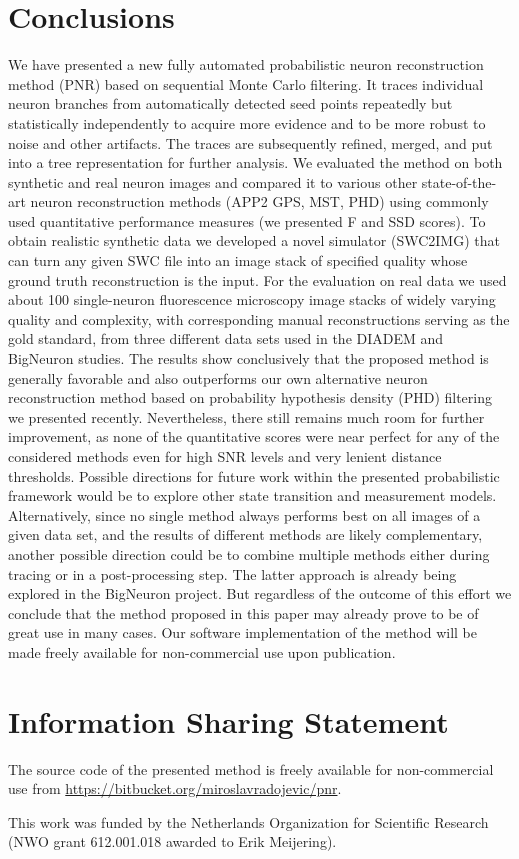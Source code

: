 \section{Conclusions} 
\label{sec:conclusions}
We have presented a new fully automated probabilistic neuron reconstruction method (PNR) based on sequential Monte Carlo filtering. It traces individual neuron branches from automatically detected seed points repeatedly but statistically independently to acquire more evidence and to be more robust to noise and other artifacts. The traces are subsequently refined, merged, and put into a tree representation for further analysis. We evaluated the method on both synthetic and real neuron images and compared it to various other state-of-the-art neuron reconstruction methods (APP2 GPS, MST, PHD) using commonly used quantitative performance measures (we presented F and SSD scores). To obtain realistic synthetic data we developed a novel simulator (SWC2IMG) that can turn any given SWC file into an image stack of specified quality whose ground truth reconstruction is the input. For the evaluation on real data we used about 100 single-neuron fluorescence microscopy image stacks of widely varying quality and complexity, with corresponding manual reconstructions serving as the gold standard, from three different data sets used in the DIADEM and BigNeuron studies. The results show conclusively that the proposed method is generally favorable and also outperforms our own alternative neuron reconstruction method based on probability hypothesis density (PHD) filtering we presented recently. Nevertheless, there still remains much room for further improvement, as none of the quantitative scores were near perfect for any of the considered methods even for high SNR levels and very lenient distance thresholds. Possible directions for future work within the presented probabilistic framework would be to explore other state transition and measurement models. Alternatively, since no single method always performs best on all images of a given data set, and the results of different methods are likely complementary, another possible direction could be to combine multiple methods either during tracing or in a post-processing step. The latter approach is already being explored in the BigNeuron project. But regardless of the outcome of this effort we conclude that the method proposed in this paper may already prove to be of great use in many cases. Our software implementation of the method will be made freely available for non-commercial use upon publication.

\section{Information Sharing Statement}
The source code of the presented method is freely available for non-commercial use from \url{https://bitbucket.org/miroslavradojevic/pnr}.

\begin{acknowledgements}
This work was funded by the Netherlands Organization for Scientific Research (NWO grant 612.001.018 awarded to Erik Meijering).
\end{acknowledgements}


